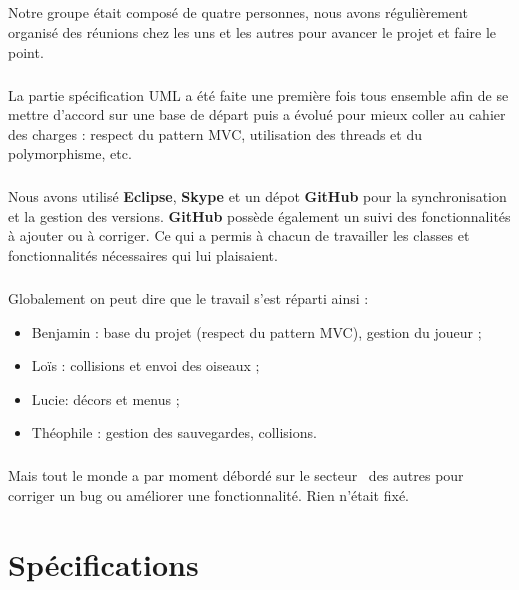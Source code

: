 \documentclass[a4paper,12pt]{report}
\renewcommand{\emph}{\textbf}
\begin{document}
\paragraph{}Notre groupe était composé de quatre personnes, nous avons régulièrement organisé des réunions chez les uns et les autres pour avancer le projet et faire le point.

\paragraph{}La partie spécification UML a été faite une première fois tous ensemble afin de se mettre d'accord sur une base de départ puis a évolué pour mieux coller au cahier des charges : respect du pattern MVC, utilisation des threads et du polymorphisme, etc.

\paragraph{}Nous avons utilisé \emph{Eclipse}, \emph{Skype} et un dépot \emph{GitHub} pour la synchronisation et la gestion des versions. \emph{GitHub} possède également un suivi des fonctionnalités à ajouter ou à corriger. Ce qui a permis à chacun de travailler les classes et fonctionnalités nécessaires qui lui plaisaient.

\paragraph{}Globalement on peut dire que le travail s'est réparti ainsi :
\begin{itemize}
\item Benjamin  : base du projet (respect du pattern MVC), gestion du joueur ;
\item Loïs : collisions et envoi des oiseaux ;
\item Lucie: décors et menus ;
\item Théophile : gestion des sauvegardes, collisions.
\end{itemize}

\paragraph{}Mais tout le monde a par moment débordé sur le \guillemotleft secteur\guillemotright~ des autres pour corriger un bug ou améliorer une fonctionnalité. Rien n'était fixé.

\chapter{Spécifications}
\end{document}
